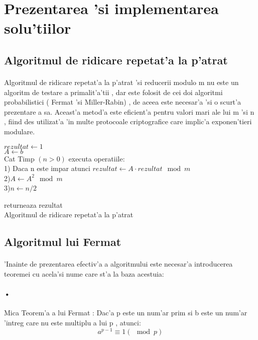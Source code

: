\documentclass[12pt,twoside]{article}
\newcommand\tab[1][1cm]{\hspace*{#1}}
\numberwithin{figure}{section}
\begin{document}
\section{Prezentarea 'si implementarea solu'tiilor}

\subsection{Algoritmul de ridicare repetat'a la p'atrat}
\paragraph{}
Algoritmul de ridicare repetat'a la p'atrat 'si reducerii modulo m nu este un algoritm de testare a primalit'a'tii , dar este folosit de cei doi algoritmi probabilistici ( Fermat 'si Miller-Rabin) , de aceea este necesar'a 'si o scurt'a prezentare a sa. Aceast'a metod'a este eficient'a pentru valori mari ale lui m 'si n , fiind des utilizat'a 'in multe protocoale criptografice care implic'a exponen'tieri modulare.


\begin{algorithm}
 

$rezultat \gets 1$
\\ $A \gets b$
\\
Cat Timp $(n > 0)$ executa operatiile:\\
{
\tab 1) Daca n este impar atunci $rezultat \gets A \cdot {rezultat} \mod {m}$ \\
\tab 2)$A \gets  A^2 \mod m$ \\
\tab 3)$n \gets n/2$ \\
}

returneaza rezultat \\
\caption{Algoritmul de ridicare repetat'a la p'atrat}
\end{algorithm}


\newpage
\subsection{Algoritmul lui Fermat}
\paragraph{}
'Inainte de prezentarea efectiv'a a algoritmului este necesar'a introducerea teoremei cu acela'si nume care st'a la baza acestuia:
\paragraph{•}
Mica Teorem'a a lui Fermat : Dac'a p este un num'ar prim si b este un num'ar 'intreg care nu este multiplu a lui p , atunci:
\begin{equation}
a^{p-1} \equiv 1 (\mod p)
\end{equation}
\end{document}
